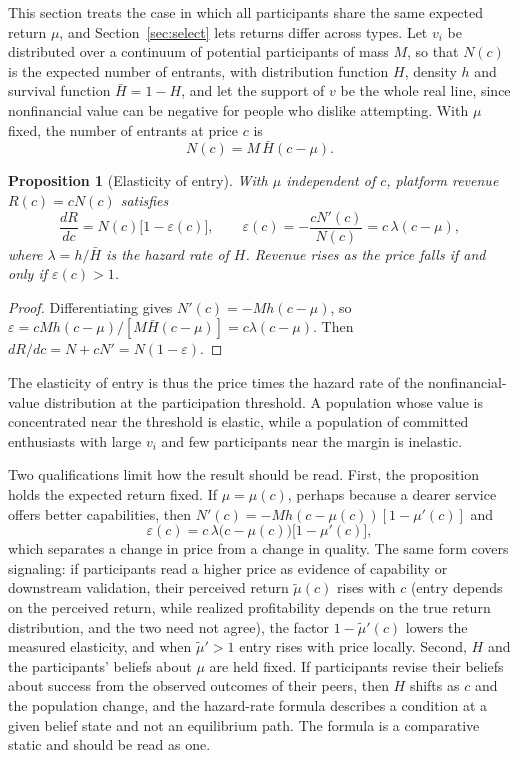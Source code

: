 \documentclass[11pt]{article}
\newtheorem{proposition}{Proposition}
\theoremstyle{remark}
\newcommand{\Hbar}{\bar H}
\begin{document}
This section treats the case in which all participants share the same expected return $\mu$, and Section~\ref{sec:select} lets returns differ across types. Let $v_i$ be distributed over a continuum of potential participants of mass $M$, so that $N(c)$ is the expected number of entrants, with distribution function $H$, density $h$ and survival function $\Hbar=1-H$, and let the support of $v$ be the whole real line, since nonfinancial value can be negative for people who dislike attempting. With $\mu$ fixed, the number of entrants at price $c$ is
\[
N(c) = M\,\Hbar(c-\mu).
\]

\begin{proposition}[Elasticity of entry]\label{prop:elast}
With $\mu$ independent of $c$, platform revenue $R(c)=cN(c)$ satisfies
\[
\frac{dR}{dc} = N(c)\bigl[1-\varepsilon(c)\bigr], \qquad \varepsilon(c) = -\frac{cN'(c)}{N(c)} = c\,\lambda(c-\mu),
\]
where $\lambda=h/\Hbar$ is the hazard rate of $H$. Revenue rises as the price falls if and only if $\varepsilon(c)>1$.
\end{proposition}

\begin{proof}
Differentiating gives $N'(c)=-M h(c-\mu)$, so $\varepsilon = cMh(c-\mu)/[M\Hbar(c-\mu)] = c\lambda(c-\mu)$. Then $dR/dc = N + cN' = N(1-\varepsilon)$.
\end{proof}

The elasticity of entry is thus the price times the hazard rate of the nonfinancial-value distribution at the participation threshold. A population whose value is concentrated near the threshold is elastic, while a population of committed enthusiasts with large $v_i$ and few participants near the margin is inelastic.

Two qualifications limit how the result should be read. First, the proposition holds the expected return fixed. If $\mu=\mu(c)$, perhaps because a dearer service offers better capabilities, then $N'(c)=-Mh(c-\mu(c))[1-\mu'(c)]$ and
\[
\varepsilon(c)=c\,\lambda\bigl(c-\mu(c)\bigr)\bigl[1-\mu'(c)\bigr],
\]
which separates a change in price from a change in quality. The same form covers signaling: if participants read a higher price as evidence of capability or downstream validation, their perceived return $\tilde\mu(c)$ rises with $c$ (entry depends on the perceived return, while realized profitability depends on the true return distribution, and the two need not agree), the factor $1-\tilde\mu'(c)$ lowers the measured elasticity, and when $\tilde\mu'>1$ entry rises with price locally. Second, $H$ and the participants' beliefs about $\mu$ are held fixed. If participants revise their beliefs about success from the observed outcomes of their peers, then $H$ shifts as $c$ and the population change, and the hazard-rate formula describes a condition at a given belief state and not an equilibrium path. The formula is a comparative static and should be read as one.
\end{document}
